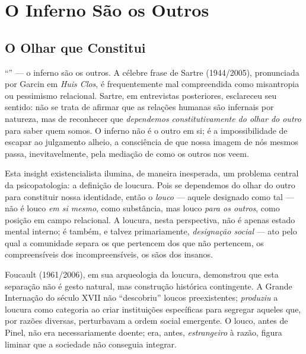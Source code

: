 \chapter{O Inferno São os Outros}
\label{ch:inferno-outros}

\section{O Olhar que Constitui}
\label{sec:olhar-constitui}

\enquote{} --- o inferno são os outros. A célebre frase de Sartre (1944/2005), pronunciada por Garcin em \textit{Huis Clos}, é frequentemente mal compreendida como misantropia ou pessimismo relacional. Sartre, em entrevistas posteriores, esclareceu seu sentido: não se trata de afirmar que as relações humanas são infernais por natureza, mas de reconhecer que \textit{dependemos constitutivamente do olhar do outro} para saber quem somos. O inferno não é o outro em si; é a impossibilidade de escapar ao julgamento alheio, a consciência de que nossa imagem de nós mesmos passa, inevitavelmente, pela mediação de como os outros nos veem.

Esta insight existencialista ilumina, de maneira inesperada, um problema central da psicopatologia: a definição de loucura. Pois se dependemos do olhar do outro para constituir nossa identidade, então o \textit{louco} --- aquele designado como tal --- não é louco \textit{em si mesmo}, como substância, mas louco \textit{para os outros}, como posição em campo relacional. A loucura, nesta perspectiva, não é apenas estado mental interno; é também, e talvez primariamente, \textit{designação social} --- ato pelo qual a comunidade separa os que pertencem dos que não pertencem, os compreensíveis dos incompreensíveis, os sãos dos insanos.

Foucault (1961/2006), em sua arqueologia da loucura, demonstrou que esta separação não é gesto natural, mas construção histórica contingente. A Grande Internação do século XVII não \enquote{descobriu} loucos preexistentes; \textit{produziu} a loucura como categoria ao criar instituições específicas para segregar aqueles que, por razões diversas, perturbavam a ordem social emergente. O louco, antes de Pinel, não era necessariamente doente; era, antes, \textit{estrangeiro} à razão, figura liminar que a sociedade não conseguia integrar.

